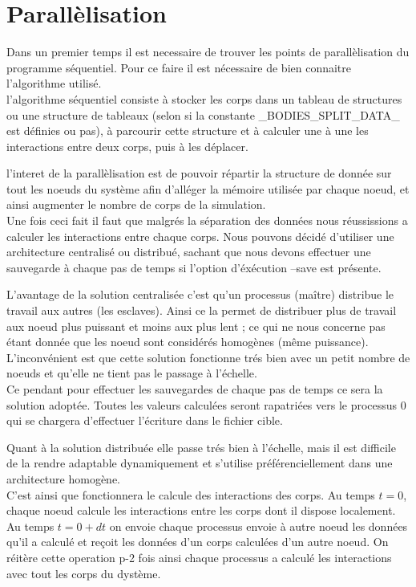 \section{Parallèlisation}

\par Dans un premier temps il est necessaire de trouver les points de parallèlisation 
du programme séquentiel. Pour ce faire il est nécessaire de bien connaitre l'algorithme 
utilisé.\\
l'algorithme séquentiel consiste à stocker les corps dans un tableau de structures ou une structure 
de tableaux (selon si la constante \_BODIES\_SPLIT\_DATA\_ est définies ou pas), à parcourir 
cette structure et à calculer une à une les interactions entre deux corps, puis à les déplacer.\\

\par l'interet de la parallèlisation est de pouvoir répartir la structure de donnée sur tout les
noeuds du système afin d'alléger la mémoire utilisée par chaque noeud, et ainsi augmenter le 
nombre de corps de la simulation.\\

Une fois ceci fait il faut que malgrés la séparation des données nous réussissions a calculer
les interactions entre chaque corps. Nous pouvons décidé d'utiliser une architecture centralisé 
ou distribué, sachant que nous devons effectuer une sauvegarde à chaque pas de temps si l'option 
d'éxécution --save est présente.\\

\par L'avantage de la solution centralisée c'est qu'un processus (maître) distribue le travail aux autres
(les esclaves). Ainsi ce la permet de distribuer plus de travail aux noeud plus puissant et moins aux
plus lent ; ce qui ne nous concerne pas étant donnée que les noeud sont considérés homogènes
(même puissance).\\
L'inconvénient est que cette solution fonctionne trés bien avec un petit nombre de noeuds et qu'elle 
ne tient pas le passage à l'échelle.\\
Ce pendant pour effectuer les sauvegardes de chaque pas de temps ce sera la solution adoptée. 
Toutes les valeurs calculées seront rapatriées vers le processus 0 qui se chargera d'effectuer 
l'écriture  dans le fichier cible.\\
\par Quant à la solution distribuée elle passe trés bien à l'échelle, mais il est difficile de
la rendre adaptable dynamiquement et s'utilise préférenciellement dans une architecture homogène.
\\C'est ainsi que fonctionnera le calcule des interactions des corps. Au temps $t=0$, chaque noeud 
calcule les interactions entre les corps dont il dispose localement. Au temps $t=0+dt$ on envoie chaque
processus envoie à autre noeud les données qu'il a calculé et reçoit les données d'un corps
calculées d'un autre noeud. On réitère cette operation p-2 fois ainsi chaque processus a
calculé les interactions avec tout les corps du dystème.\\


